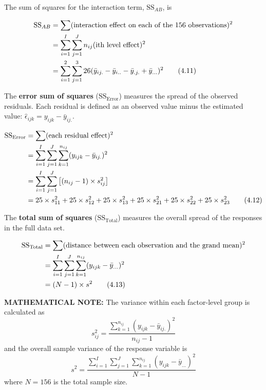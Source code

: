 \documentclass[
]{report}
\begin{document}
The sum of squares for the interaction term, \(\text{SS}_{AB}\), is

\begin{align}\label{4.11}
\text{SS}_{AB} &= \sum (\text{interaction effect on each of the 156 observations})^2 \notag \\
&= \sum_{i=1}^{I} \sum_{j=1}^{J} n_{ij} (\text{ith level effect})^2 \notag \\
&= \sum_{i=1}^{2} \sum_{j=1}^{3} 26 (\bar{y}_{ij.} - \bar{y}_{i..} - \bar{y}_{.j.} + \bar{y}_{...})^2
\tag{4.11}
\end{align}

The \textbf{error sum of squares} (\(\text{SS}_{\text{Error}}\)) measures the spread of the observed residuals. Each residual is defined as an observed value minus the estimated value: \(\hat{\epsilon}_{ijk} = y_{ijk} - \bar{y}_{ij.}\).

\begin{align}\label{4.12}
\text{SS}_{\text{Error}} &= \sum (\text{each residual effect})^2 \notag \\
&= \sum_{i=1}^{I} \sum_{j=1}^{J} \sum_{k=1}^{n_{ij}} (y_{ijk} - \bar{y}_{ij.})^2 \notag \\
&= \sum_{i=1}^{I} \sum_{j=1}^{J} \left[(n_{ij} - 1) \times s_{ij}^2 \right] \notag \\
&= 25 \times s_{11}^2 + 25 \times s_{12}^2 + 25 \times s_{13}^2 + 25 \times s_{21}^2 + 25 \times s_{22}^2 + 25 \times s_{23}^2
\tag{4.12}
\end{align}

The \textbf{total sum of squares} (\(\text{SS}_{\text{Total}}\)) measures the overall spread of the responses in the full data set.

\begin{align}\label{4.13}
\text{SS}_{\text{Total}} &= \sum (\text{distance between each observation and the grand mean})^2 \notag \\
&= \sum_{i=1}^{I} \sum_{j=1}^{J} \sum_{k=1}^{n_{ij}} (y_{ijk} - \bar{y}_{...})^2 \notag \\
&= (N-1) \times s^2
\tag{4.13}
\end{align}

\large

\textbf{MATHEMATICAL NOTE:}
The variance within each factor-level group is calculated as
\[
s_{ij}^2 = \frac{\sum_{k=1}^{n_{ij}} (y_{ijk} - \bar{y}_{ij.})^2}{n_{ij} - 1}
\]
and the overall sample variance of the response variable is
\[
s^2 = \frac{\sum_{i=1}^{I} \sum_{j=1}^{J} \sum_{k=1}^{n_{ij}} (y_{ijk} - \bar{y}_{...})^2}{N-1}
\]
where \(N = 156\) is the total sample size.
\normalsize
\end{document}
